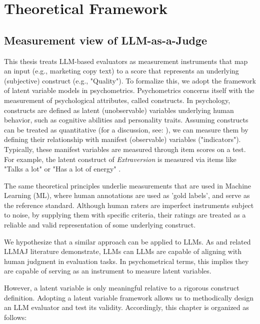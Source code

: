 
\section{Theoretical Framework}

\subsection{Measurement view of LLM-as-a-Judge}

This thesis treats LLM-based evaluators as measurement instruments that map an input (e.g., marketing copy text) to a score that represents an underlying (subjective) construct (e.g., "Quality"). To formalize this, we adopt the framework of latent variable models in psychometrics. Psychometrics concerns itself with the measurement of psychological attributes, called constructs. In psychology, constructs are defined as latent (unobservable) variables underlying human behavior, such as cognitive abilities and personality traits. Assuming constructs can be treated as quantitative (for a discussion, see: \citep{borsboom2003theoretical}), we can measure them by defining their relationship with manifest (observable) variables ("indicators"). Typically, these manifest variables are measured through item scores on a test. For example, the latent construct of \textit{Extraversion} is measured via items like "Talks a lot" or "Has a lot of energy" \citep{john1991big}. 

The same theoretical principles underlie measurements that are used in Machine Learning (ML), where human annotations are used as 'gold labels', and serve as the reference standard. Although human raters are imperfect instruments subject to noise, by supplying them with specific criteria, their ratings are treated as a reliable and valid representation of some underlying construct. 

We hypothesize that a similar approach can be applied to LLMs. As \citet{zheng_judging_2023} and related LLMAJ literature demonstrate, LLMs can LLMs are capable of aligning with human judgment in evaluation tasks. In psychometrical terms, this implies they are capable of serving as an instrument to measure latent variables.

However, a latent variable is only meaningful relative to a rigorous construct definition. Adopting a latent variable framework allows us to methodically design an LLM evaluator and test its validity. Accordingly, this chapter is organized as follows: 

